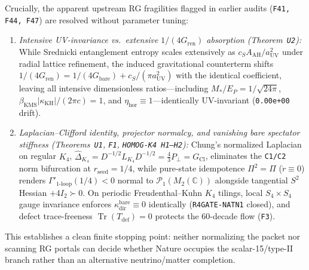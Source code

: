 Crucially, the apparent upstream RG fragilities flagged in earlier audits (\texttt{F41, F44, F47}) are resolved without parameter tuning:
\begin{enumerate}
\item \emph{Intensive UV-invariance vs.\ extensive $1/(4G_{\mathrm{ren}})$ absorption (Theorem~\texttt{U2}):} While Srednicki entanglement entropy scales extensively as $c_S A_{\mathrm{AH}}/a_{\mathrm{UV}}^2$ under radial lattice refinement, the induced gravitational counterterm shifts $1/(4G_{\mathrm{ren}})=1/(4G_{\mathrm{bare}})+c_S/(\pi a_{\mathrm{UV}}^2)$ with the identical coefficient, leaving all intensive dimensionless ratios---including $M_*/E_P=1/\sqrt{24\pi}$, $\beta_{\mathrm{KMS}}|\kappa_{\mathrm{KH}}|/(2\pi c)=1$, and $\eta_{\mathrm{hor}}\equiv 1$---identically UV-invariant (\texttt{0.00e+00} drift).
\item \emph{Laplacian--Clifford identity, projector normalcy, and vanishing bare spectator stiffness (Theorems~\texttt{U1}, \texttt{F1}, \texttt{HOMOG-K4 H1--H2}):} Chung's normalized Laplacian on regular $K_4$, $\widehat{\Delta}_{K_4}=D^{-1/2}L_{K_4}D^{-1/2}=\frac{4}{3}P_\perp=G_{\mathrm{Cl}}$, eliminates the \texttt{C1/C2} norm bifurcation at $r_{\mathrm{seed}}=1/4$, while pure-state idempotence $\Pi^2=\Pi$ ($\dot{r}\equiv 0$) renders $\Gamma'_{1\text{-loop}}(1/4)<0$ normal to $\mathcal{P}_1(M_2(\mathbb{C}))$ alongside tangential $S^2$ Hessian $+4I_2\succ 0$. On periodic Freudenthal--Kuhn $K_4$ tilings, local $S_4\times S_4$ gauge invariance enforces $\kappa_{\mathrm{dir}}^{\mathrm{bare}}\equiv 0$ identically (\texttt{R4GATE-NATN1} closed), and defect trace-freeness $\operatorname{Tr}(T_{\mathrm{def}})=0$ protects the 60-decade flow (\texttt{F3}).
\end{enumerate}
This establishes a clean finite stopping point: neither normalizing the packet nor scanning RG portals can decide whether Nature occupies the scalar-15/type-II branch rather than an alternative neutrino/matter completion.
